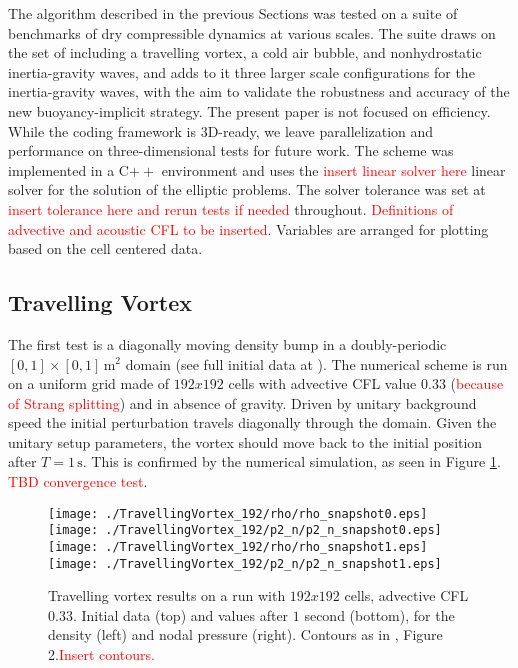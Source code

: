 \documentclass{ametsoc}
\theoremstyle{definition}
\newcommand{\benacchio}[1]{\textcolor{red}{#1}}
\begin{document}
The algorithm described in the previous Sections was tested on a suite of benchmarks of dry compressible dynamics at various scales. The suite draws on the set of \cite{Benacchio2014,BenacchioEtAl2014} including a travelling vortex, a cold air bubble, and nonhydrostatic inertia-gravity waves, and adds to it three larger scale configurations for the inertia-gravity waves, with the aim to validate the robustness and accuracy of the new buoyancy-implicit strategy. The present paper is not focused on efficiency. While the coding framework is 3D-ready, we leave parallelization and performance on three-dimensional tests for future work. The scheme was implemented in a C$++$ environment and uses the \benacchio{insert linear solver here} linear solver for the solution of the elliptic problems. The solver tolerance was set at \benacchio{insert tolerance here and rerun tests if needed} throughout. \benacchio{Definitions of advective and acoustic CFL to be inserted}. Variables are arranged for plotting based on the cell centered data.


\subsection{Travelling Vortex}

The first test is a diagonally moving density bump in a doubly-periodic $[0,1]\times[0,1]\,\textrm{m}^2$ domain (see full initial data at \cite{KadiogluEtAl2008}). The numerical scheme is run on a uniform grid made of $192x192$ cells with advective CFL value $0.33$ (\benacchio{because of Strang splitting}) and in absence of gravity. Driven by unitary background speed the initial perturbation travels diagonally through the domain. Given the unitary setup parameters, the vortex should move back to the initial position after $T=1\,\textrm{s}$. This is confirmed by the numerical simulation, as seen in Figure \ref{fig:trav_vortex_res}. \benacchio{TBD convergence test}.

\begin{figure}
\centering
 \texttt{[image: ./TravellingVortex\_192/rho/rho\_snapshot0.eps]}\texttt{[image: ./TravellingVortex\_192/p2\_n/p2\_n\_snapshot0.eps]}\\
 \texttt{[image: ./TravellingVortex\_192/rho/rho\_snapshot1.eps]}
 \texttt{[image: ./TravellingVortex\_192/p2\_n/p2\_n\_snapshot1.eps]}
 \caption{Travelling vortex results on a run with $192x192$ cells, advective CFL 0.33. Initial data (top) and values after $1$ second (bottom), for the density (left) and nodal pressure (right). Contours as in \cite{Benacchio2014}, Figure 2.\benacchio{Insert contours.}}
 \label{fig:trav_vortex_res}
\end{figure}
\end{document}
